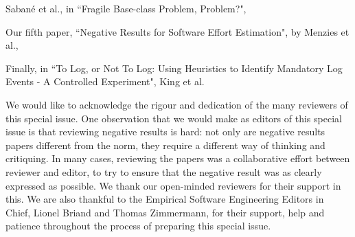 \documentclass{svjour3}                     %
\begin{document}
Sabané et al., in ``Fragile Base-class Problem, Problem?",

Our fifth paper,
``Negative Results for Software Effort Estimation", by Menzies et al.,

Finally, in
``To Log, or Not To Log: Using Heuristics to Identify Mandatory Log Events - A Controlled Experiment", King et al.

We would like to acknowledge the rigour and dedication of the many reviewers of this special issue. One observation that we would make as editors of this special issue is that reviewing negative results is hard: not only are negative results papers different from the norm, they require a different way of thinking and critiquing. In many cases, reviewing the papers was a collaborative effort between reviewer and editor, to try to ensure that the negative result was as clearly expressed as possible. We thank our open-minded reviewers for their support in this. We are also thankful to the Empirical Software Engineering Editors in Chief, Lionel Briand and Thomas Zimmermann, for their support, help and patience throughout the process of preparing this special issue.
\end{document}
